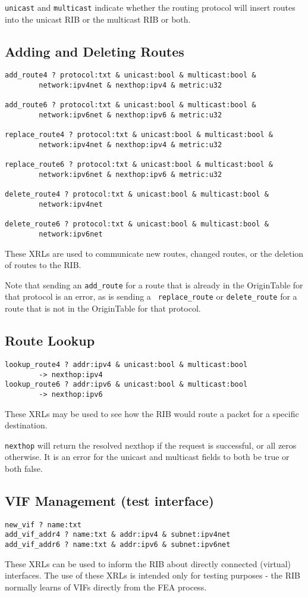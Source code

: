 \documentclass[11pt]{article}
\begin{document}
{\tt unicast} and {\tt multicast} indicate whether the routing
protocol will insert routes into the unicast RIB or the multicast RIB
or both.

\subsection{Adding and Deleting Routes}
\begin{verbatim}
add_route4 ? protocol:txt & unicast:bool & multicast:bool & 
        network:ipv4net & nexthop:ipv4 & metric:u32

add_route6 ? protocol:txt & unicast:bool & multicast:bool & 
        network:ipv6net & nexthop:ipv6 & metric:u32

replace_route4 ? protocol:txt & unicast:bool & multicast:bool & 
        network:ipv4net & nexthop:ipv4 & metric:u32

replace_route6 ? protocol:txt & unicast:bool & multicast:bool & 
        network:ipv6net & nexthop:ipv6 & metric:u32

delete_route4 ? protocol:txt & unicast:bool & multicast:bool & 
        network:ipv4net

delete_route6 ? protocol:txt & unicast:bool & multicast:bool & 
        network:ipv6net
\end{verbatim}
These XRLs are used to communicate new routes, changed routes, or the
deletion of routes to the RIB.

Note that sending an {\tt add\_route} for a route that is already in
the OriginTable for that protocol is an error, as is sending a {\tt
replace\_route} or {\tt delete\_route} for a route that is not in the
OriginTable for that protocol.

\subsection{Route Lookup}
\begin{verbatim}
lookup_route4 ? addr:ipv4 & unicast:bool & multicast:bool 
        -> nexthop:ipv4
lookup_route6 ? addr:ipv6 & unicast:bool & multicast:bool 
        -> nexthop:ipv6
\end{verbatim}
These XRLs may be used to see how the RIB would route a packet for a
specific destination.

{\tt nexthop} will return the resolved nexthop if the request is successful,
or all zeros otherwise.  It is an error for the unicast and multicast
fields to both be true or both false.

\subsection{VIF Management (test interface)}
\begin{verbatim}
new_vif ? name:txt
add_vif_addr4 ? name:txt & addr:ipv4 & subnet:ipv4net
add_vif_addr6 ? name:txt & addr:ipv6 & subnet:ipv6net
\end{verbatim}
These XRLs can be used to inform the RIB about directly connected
(virtual) interfaces.  The use of these XRLs is intended only for
testing purposes - the RIB normally learns of VIFs directly from the
FEA process.
 
\end{document}
